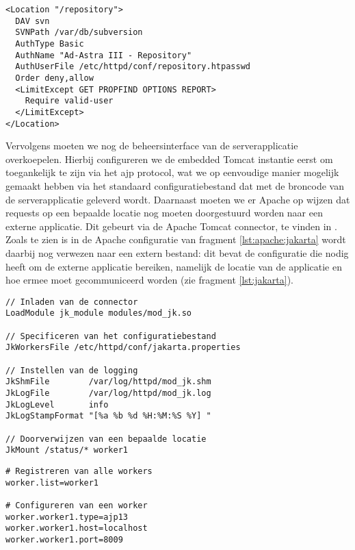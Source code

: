 \begin{lstlisting}[language=ApacheConfig, caption=Configuratie van Apache om een \acs{svn} server te overkoepelen., label=lst:apache:svn]
<Location "/repository">
  DAV svn
  SVNPath /var/db/subversion
  AuthType Basic
  AuthName "Ad-Astra III - Repository"
  AuthUserFile /etc/httpd/conf/repository.htpasswd
  Order deny,allow
  <LimitExcept GET PROPFIND OPTIONS REPORT>
    Require valid-user
  </LimitExcept>
</Location>
\end{lstlisting}

Vervolgens moeten we nog de beheersinterface van de serverapplicatie overkoepelen. Hierbij configureren we de embedded Tomcat instantie eerst om toegankelijk te zijn via het \ac{ajp} protocol, wat we op eenvoudige manier mogelijk gemaakt hebben via het standaard configuratiebestand dat met de broncode van de serverapplicatie geleverd wordt. Daarnaast moeten we er Apache op wijzen dat requests op een bepaalde locatie nog moeten doorgestuurd worden naar een externe applicatie. Dit gebeurt via de Apache Tomcat connector, te vinden in . Zoals te zien is in de Apache configuratie van fragment \ref{lst:apache:jakarta} wordt daarbij nog verwezen naar een extern bestand: dit bevat de configuratie die  nodig heeft om de externe applicatie bereiken, namelijk de locatie van de applicatie en hoe ermee moet gecommuniceerd worden (zie fragment \ref{lst:jakarta}).

\begin{lstlisting}[language=ApacheConfig, float, caption=Configuratie van Apache om een externe Jakarta applicatie te overkoepelen., label=lst:apache:jakarta]
// Inladen van de connector
LoadModule jk_module modules/mod_jk.so

// Specificeren van het configuratiebestand
JkWorkersFile /etc/httpd/conf/jakarta.properties

// Instellen van de logging
JkShmFile        /var/log/httpd/mod_jk.shm
JkLogFile        /var/log/httpd/mod_jk.log
JkLogLevel       info
JkLogStampFormat "[%a %b %d %H:%M:%S %Y] "

// Doorverwijzen van een bepaalde locatie
JkMount /status/* worker1
\end{lstlisting}

\begin{lstlisting}[language=JavaProperties, float, caption=Configuratie van de Apache Tomcat connector., label=lst:jakarta]
# Registreren van alle workers
worker.list=worker1

# Configureren van een worker
worker.worker1.type=ajp13
worker.worker1.host=localhost
worker.worker1.port=8009
\end{lstlisting}